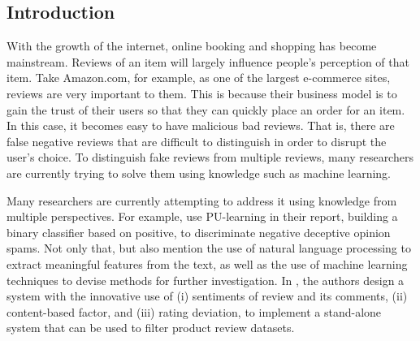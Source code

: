 \documentclass[a4paper, 11pt]{article}
\begin{document}
\begin{multicols}{2}
\maketitle

\section{Introduction}


With the growth of the internet, online booking and shopping has become mainstream. Reviews of an item will largely influence people's perception of that item. Take Amazon.com, for example, as one of the largest e-commerce sites, reviews are very important to them. This is because their business model is to gain the trust of their users so that they can quickly place an order for an item. In this case, it becomes easy to have malicious bad reviews. That is, there are false negative reviews that are difficult to distinguish in order to disrupt the user's choice. To distinguish fake reviews from multiple reviews, many researchers are currently trying to solve them using knowledge such as machine learning.

Many researchers are currently attempting to address it using knowledge from multiple perspectives. For example, \cite{1} use PU-learning in their report, building a binary classifier based on positive, to discriminate negative deceptive opinion spams. Not only that, but \cite{2} also mention the use of natural language processing to extract meaningful features from the text, as well as the use of machine learning techniques to devise methods for further investigation. In \cite{3}, the authors design a system with the innovative use of (i) sentiments of review and its comments, (ii) content-based factor, and (iii) rating deviation, to implement a stand-alone system that can be used to filter product review datasets.


\end{multicols}
\end{document}
